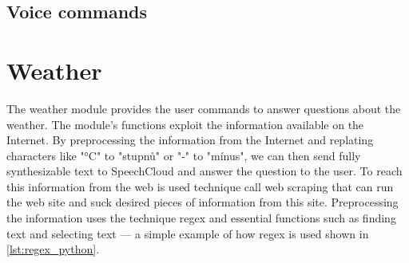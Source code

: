 \subsection{Voice commands}

\begin{table}[H]
    \centering
    \caption{Voice commands of the System module (for detail see \cref{section:app_system})} 
\end{table} 

\section{Weather}

The weather module provides the user commands to answer questions about the weather. The module's functions exploit the information available on the Internet. By preprocessing the information from the Internet and replating characters like "°C" to "stupnů" or "-" to "mínus", we can then send fully synthesizable text to SpeechCloud and answer the question to the user. To reach this information from the web is used technique call web scraping that can run the web site and suck desired pieces of information from this site. Preprocessing the information uses the technique regex and essential functions such as finding text and selecting text — a simple example of how regex is used shown in \cref{lst:regex_python}.

